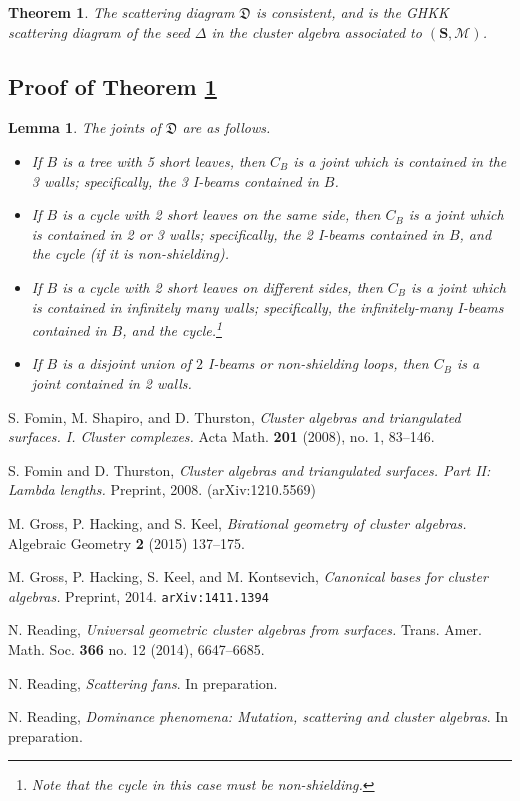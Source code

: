\documentclass{amsart}
\newtheorem{theorem}[proposition]{Theorem}
\newtheorem{lemma}[proposition]{Lemma}
\theoremstyle{definition}
\theoremstyle{remark}
\numberwithin{equation}{section}
\newcommand{\0}{{\mathbf{0}}}
\newcommand{\M}{\mathcal{M}}
\renewcommand{\S}{\mathbf{S}}
\begin{document}
\begin{theorem}\label{thm: consistent}
The scattering diagram $\mathfrak{D}$ is consistent, and is the GHKK scattering diagram of the seed $\Delta$ in the cluster algebra associated to $(\S,\M)$.
\end{theorem}

\subsection{Proof of Theorem \ref{thm: consistent}}

\begin{lemma}
The joints of $\mathfrak{D}$ are as follows.%
\begin{itemize}
	\item If $B$ is a tree with 5 short leaves, then $C_B$ is a joint which is contained in the 3 walls; specifically, the 3 I-beams contained in $B$.
	\item If $B$ is a cycle with 2 short leaves on the same side, then $C_B$ is a joint which is contained in 2 or 3 walls; specifically, the 2 I-beams contained in $B$, and the cycle (if it is non-shielding).
	\item If $B$ is a cycle with 2 short leaves on different sides, then $C_B$ is a joint which is contained in infinitely many walls; specifically, the infinitely-many I-beams contained in $B$, and the cycle.\footnote{Note that the cycle in this case must be non-shielding.}
	\item If $B$ is a disjoint union of $2$ I-beams or non-shielding loops, then $C_B$ is a joint contained in 2 walls.
\end{itemize}
\end{lemma}

\begin{thebibliography}{27}

S. Fomin, M. Shapiro, and D. Thurston,
\textit{Cluster algebras and triangulated surfaces. I. Cluster complexes.}
Acta Math. \textbf{201} (2008), no. 1, 83--146. 

S. Fomin and D. Thurston,
\textit{Cluster algebras and triangulated surfaces. Part II: Lambda lengths.}
Preprint, 2008.
(arXiv:1210.5569)

M. Gross, P. Hacking, and S. Keel,
\textit{Birational geometry of cluster algebras.}
Algebraic Geometry \textbf{2} (2015) 137--175.

M. Gross, P. Hacking, S. Keel, and M. Kontsevich,
\textit{Canonical bases for cluster algebras.}
Preprint, 2014. \texttt{arXiv:1411.1394}

N. Reading,
\textit{Universal geometric cluster algebras from surfaces. }
Trans. Amer. Math. Soc. \textbf{366} no. 12 (2014), 6647--6685.

N. Reading, 
\textit{Scattering fans}. 
In preparation.

N. Reading, 
\textit{Dominance phenomena: Mutation, scattering and cluster algebras}. 
In preparation.

\end{thebibliography}
\end{document}
